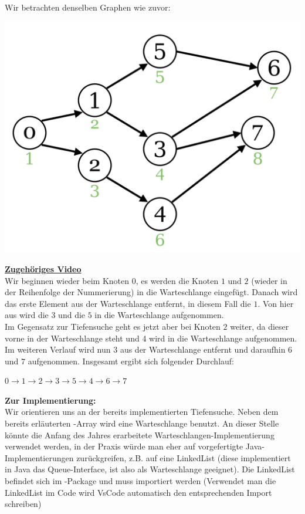 \documentclass{article}
\begin{document}
Wir betrachten denselben Graphen wie zuvor: 
\begin{center}
    \includegraphics[scale=0.15]{../media/broad_search.png}
\end{center}
\href{https://youtu.be/pgRzRGii0F4}{\textbf{Zugehöriges Video}}\\
Wir beginnen wieder beim Knoten $0$, es werden die Knoten $1$ und $2$ (wieder in der Reihenfolge der Nummerierung) in die Warteschlange eingefügt. Danach wird das erste Element aus der Warteschlange entfernt, in diesem Fall die $1$. Von hier aus wird die $3$ und die $5$ in die Warteschlange aufgenommen. \\
Im Gegensatz zur Tiefensuche geht es jetzt aber bei Knoten $2$ weiter, da dieser vorne in der Warteschlange steht und 4 wird in die Warteschlange aufgenommen. Im weiteren Verlauf wird nun $3$ aus der Warteschlange entfernt und daraufhin $6$ und $7$ aufgenommen. Insgesamt ergibt sich folgender Durchlauf:
\begin{center}
    $0 \rightarrow 1 \rightarrow 2 \rightarrow 3 \rightarrow 5 \rightarrow 4 \rightarrow 6 \rightarrow 7$
\end{center}
\textbf{Zur Implementierung:} \\
Wir orientieren uns an der bereits implementierten Tiefensuche. Neben dem bereits erläuterten -Array wird eine Warteschlange benutzt. An dieser Stelle könnte die Anfang des Jahres erarbeitete Warteschlangen-Implementierung verwendet werden, in der Praxis würde man eher auf vorgefertigte Java-Implementierungen zurückgreifen, z.B. auf eine LinkedList (diese implementiert in Java das Queue-Interface, ist also als Warteschlange geeignet). Die LinkedList befindet sich im -Package und muss importiert werden (Verwendet man die LinkedList im Code wird VsCode automatisch den entsprechenden Import schreiben)
\end{document}
